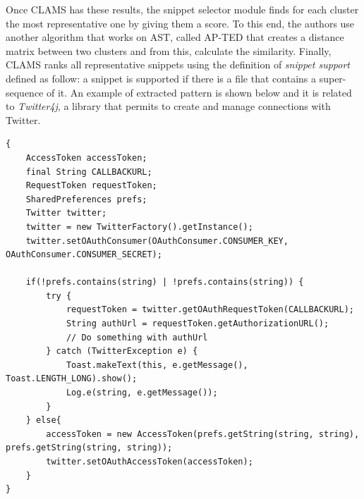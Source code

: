 Once CLAMS has these results, the snippet 
selector module finds for each 
cluster the most representative one by 
giving them a score. To this end, 
the authors use another algorithm that 
works on AST, called AP-TED that creates 
a distance matrix between two clusters and 
from this, calculate the similarity. 
Finally, CLAMS ranks all representative 
snippets using the definition of 
\textit{snippet support} defined as follow: 
a snippet is supported if there is 
a file that contains a super-sequence of 
it. An example of extracted pattern is 
shown below and it is related to 
\textit{Twitter4j}, a library that permits 
to 
create and manage connections with Twitter. 
\begin{lstlisting}
{
    AccessToken accessToken;
    final String CALLBACKURL;
    RequestToken requestToken;
    SharedPreferences prefs;
    Twitter twitter;
    twitter = new TwitterFactory().getInstance();
    twitter.setOAuthConsumer(OAuthConsumer.CONSUMER_KEY, OAuthConsumer.CONSUMER_SECRET);

    if(!prefs.contains(string) | !prefs.contains(string)) {
        try {
            requestToken = twitter.getOAuthRequestToken(CALLBACKURL);
            String authUrl = requestToken.getAuthorizationURL();
            // Do something with authUrl
        } catch (TwitterException e) {
            Toast.makeText(this, e.getMessage(), Toast.LENGTH_LONG).show();
            Log.e(string, e.getMessage());
        }
    } else{
        accessToken = new AccessToken(prefs.getString(string, string), prefs.getString(string, string));
        twitter.setOAuthAccessToken(accessToken);
    }
}
	
\end{lstlisting}

